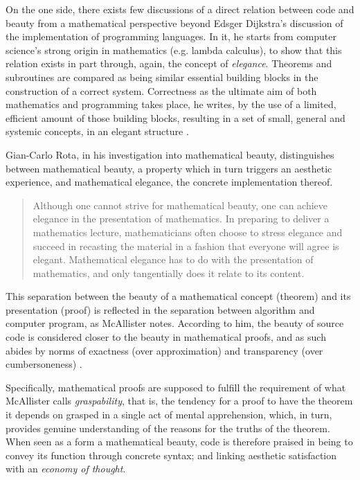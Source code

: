 On the one side, there exists few discussions of a direct relation between code and beauty from a mathematical perspective beyond Edsger Dijkstra's discussion of the implementation of programming languages. In it, he starts from computer science's strong origin in mathematics (e.g. lambda calculus), to show that this relation exists in part through, again, the concept of \emph{elegance}. Theorems and subroutines are compared as being similar essential building blocks in the construction of a correct system. Correctness as the ultimate aim of both mathematics and programming takes place, he writes, by the use of a limited, efficient amount of those building blocks, resulting in a set of small, general and systemic concepts, in an elegant structure \citep{dijkstra_design_1963}.

Gian-Carlo Rota, in his investigation into mathematical beauty, distinguishes between mathematical beauty, a property which in turn triggers an aesthetic experience, and mathematical elegance, the concrete implementation thereof.

\begin{quote}
  Although one cannot strive for mathematical beauty, one can achieve elegance in the presentation of mathematics. In preparing to deliver a mathematics lecture, mathematicians often choose to stress elegance and succeed in recasting the material in a fashion that everyone will agree is elegant. Mathematical elegance has to do with the presentation of mathematics, and only tangentially does it relate to its content. \citep{rota_phenomenology_1997}
\end{quote}

This separation between the beauty of a mathematical concept (theorem) and its presentation (proof) is reflected in the separation between algorithm and computer program, as McAllister notes. According to him, the beauty of source code is considered closer to the beauty in mathematical proofs, and as such abides by norms of exactness (over approximation) and transparency (over cumbersoneness) \citep{mcallister_mathematical_2005}.

Specifically, mathematical proofs are supposed to fulfill the requirement of what McAllister calls \emph{graspability}, that is, the tendency for a proof to have the theorem it depends on grasped in a single act of mental apprehension, which, in turn, provides genuine understanding of the reasons for the truths of the theorem. When seen as a form a mathematical beauty, code is therefore praised in being to convey its function through concrete syntax; and linking aesthetic satisfaction with an \emph{economy of thought}.

